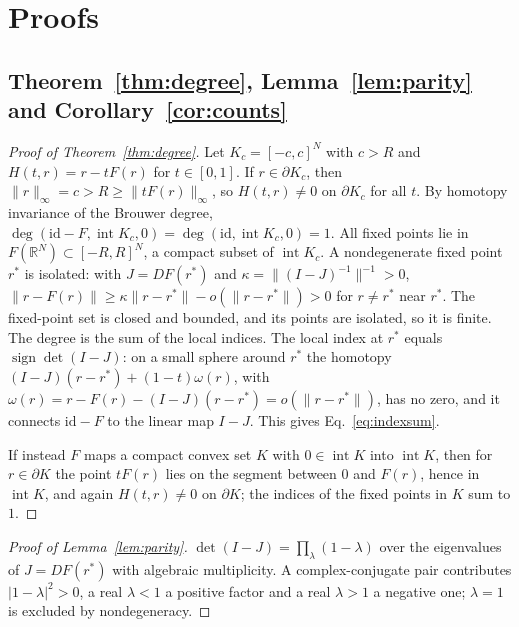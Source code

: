 \appendix

\section{Proofs}
\label{app:proofs}

\subsection{Theorem~\ref{thm:degree}, Lemma~\ref{lem:parity} and Corollary~\ref{cor:counts}}

\begin{proof}[Proof of Theorem~\ref{thm:degree}]
Let $K_c=[-c,c]^N$ with $c>R$ and $H(t,r)=r-tF(r)$ for $t\in[0,1]$. If $r\in\partial K_c$, then
$\|r\|_\infty=c>R\ge\|tF(r)\|_\infty$, so $H(t,r)\neq0$ on $\partial K_c$ for all $t$. By homotopy invariance of the
Brouwer degree,\cite{Deimling1985NFA} $\deg(\mathrm{id}-F,\operatorname{int}K_c,0)=\deg(\mathrm{id},\operatorname{int}K_c,0)=1$.
All fixed points lie in $F(\mathbb{R}^N)\subset[-R,R]^N$, a compact subset of $\operatorname{int}K_c$. A nondegenerate fixed
point $r^*$ is isolated: with $J=DF(r^*)$ and $\kappa=\|(I-J)^{-1}\|^{-1}>0$,
$\|r-F(r)\|\ge\kappa\|r-r^*\|-o(\|r-r^*\|)>0$ for $r\neq r^*$ near $r^*$. The fixed-point set is closed and bounded, and its
points are isolated, so it is finite. The degree is the sum of the local indices. The local index at $r^*$ equals
$\operatorname{sign}\det(I-J)$: on a small sphere around $r^*$ the homotopy $(I-J)(r-r^*)+(1-t)\omega(r)$, with
$\omega(r)=r-F(r)-(I-J)(r-r^*)=o(\|r-r^*\|)$, has no zero, and it connects $\mathrm{id}-F$ to the linear map
$I-J$.\cite{Deimling1985NFA,GranasDugundji2003Fixed} This gives Eq.~\eqref{eq:indexsum}.

If instead $F$ maps a compact convex set $K$ with $0\in\operatorname{int}K$ into $\operatorname{int}K$, then for
$r\in\partial K$ the point $tF(r)$ lies on the segment between $0$ and $F(r)$, hence in $\operatorname{int}K$, and again
$H(t,r)\neq0$ on $\partial K$; the indices of the fixed points in $K$ sum to $1$.
\end{proof}

\begin{proof}[Proof of Lemma~\ref{lem:parity}]
$\det(I-J)=\prod_\lambda(1-\lambda)$ over the eigenvalues of $J=DF(r^*)$ with algebraic multiplicity. A complex-conjugate pair
contributes $|1-\lambda|^2>0$, a real $\lambda<1$ a positive factor and a real $\lambda>1$ a negative one; $\lambda=1$ is
excluded by nondegeneracy.
\end{proof}

